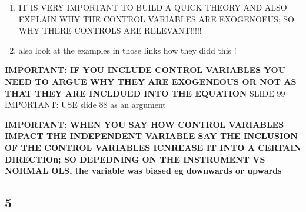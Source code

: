 \documentclass[a4paper]{article}
\begin{document}
\begin{enumerate}
   \item IT IS VERY IMPORTANT TO BUILD A QUICK THEORY AND ALSO EXPLAIN WHY THE CONTROL VARIABLES ARE EXOGENOEUS; SO WHY THERE CONTROLS ARE RELEVANT!!!!!
   \item also look at the examples in those links how they didd this !
\end{enumerate}








\textbf{IMPORTANT: IF YOU INCLUDE CONTROL VARIABLES YOU NEED TO ARGUE WHY THEY ARE EXOGENEOUS OR NOT AS THAT THEY ARE INCLDUED INTO THE EQUATION}
SLIDE 99
IMPORTANT: USE slide 88 as an argument

\textbf{IMPORTANT: WHEN YOU SAY HOW CONTROL VARIABLES IMPACT THE INDEPENDENT VARIABLE SAY THE INCLUSION OF THE CONTROL VARIABLES ICNREASE IT INTO A CERTAIN DIRECTIOn; SO DEPEDNING ON THE INSTRUMENT VS NORMAL OLS, the variable was biased eg downwards or upwards}

\subsection{5 -- }
\end{document}
